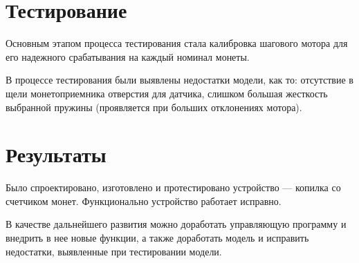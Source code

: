 \section {Тестирование}

Основным этапом процесса тестирования стала калибровка шагового мотора для его надежного срабатывания на каждый номинал монеты.
\par\medskip

В процессе тестирования были выявлены недостатки модели, как то: отсутствие в щели монетоприемника отверстия для датчика, слишком большая жесткость выбранной пружины (проявляется при больших отклонениях мотора).

\section {Результаты}

Было спроектировано, изготовлено и протестировано устройство — копилка со счетчиком монет. Функционально устройство работает исправно.
\par\medskip

В качестве дальнейшего развития можно доработать управляющую программу и внедрить в нее новые функции, а также доработать модель и исправить недостатки, выявленные при тестировании модели.